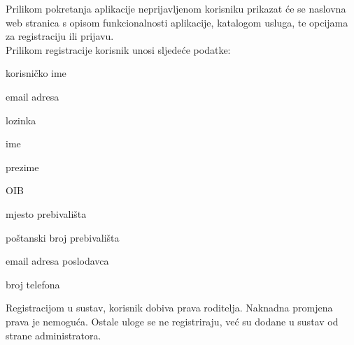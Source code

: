 		Prilikom pokretanja aplikacije neprijavljenom korisniku prikazat će se naslovna web stranica s opisom funkcionalnosti aplikacije, katalogom usluga, te opcijama za registraciju ili prijavu. \\
		Prilikom registracije korisnik unosi sljedeće podatke:
		\begin{packed_item}
			
			\item  korisničko ime
			\item  email adresa
			\item  lozinka
			\item  ime
			\item  prezime
			\item  OIB
			\item  mjesto prebivališta
			\item  poštanski broj prebivališta
			\item  email adresa poslodavca
			\item  broj telefona
			
		\end{packed_item}
		Registracijom u sustav, korisnik dobiva prava roditelja. Naknadna promjena prava je nemoguća. Ostale uloge se ne registriraju, već su dodane u sustav od strane administratora. 
		
